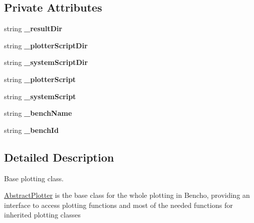 \subsection*{Private Attributes}
\begin{DoxyCompactItemize}
\item 
\hypertarget{classAbstractPlotter_ad1771e130ee6c08a5fcaf25cf7ce38d1}{string {\bfseries \-\_\-result\-Dir}}\label{classAbstractPlotter_ad1771e130ee6c08a5fcaf25cf7ce38d1}

\item 
\hypertarget{classAbstractPlotter_a7b2df33a8bc6509686a15d30c52b2116}{string {\bfseries \-\_\-plotter\-Script\-Dir}}\label{classAbstractPlotter_a7b2df33a8bc6509686a15d30c52b2116}

\item 
\hypertarget{classAbstractPlotter_a5bc0a9e0e266ae2c6c52e7560030b63f}{string {\bfseries \-\_\-system\-Script\-Dir}}\label{classAbstractPlotter_a5bc0a9e0e266ae2c6c52e7560030b63f}

\item 
\hypertarget{classAbstractPlotter_a7824736c2f3a2f00f2e2d890d245e772}{string {\bfseries \-\_\-plotter\-Script}}\label{classAbstractPlotter_a7824736c2f3a2f00f2e2d890d245e772}

\item 
\hypertarget{classAbstractPlotter_a066e691af796c7ac12fc9fb028693072}{string {\bfseries \-\_\-system\-Script}}\label{classAbstractPlotter_a066e691af796c7ac12fc9fb028693072}

\item 
\hypertarget{classAbstractPlotter_a9b14277d57b883dea19ed598b8344c5f}{string {\bfseries \-\_\-bench\-Name}}\label{classAbstractPlotter_a9b14277d57b883dea19ed598b8344c5f}

\item 
\hypertarget{classAbstractPlotter_a5e1884e89668d4e89771f01cfdc94884}{string {\bfseries \-\_\-bench\-Id}}\label{classAbstractPlotter_a5e1884e89668d4e89771f01cfdc94884}

\end{DoxyCompactItemize}


\subsection{Detailed Description}
Base plotting class. 

\hyperlink{classAbstractPlotter}{Abstract\-Plotter} is the base class for the whole plotting in Bencho, providing an interface to access plotting functions and most of the needed functions for inherited plotting classes 


